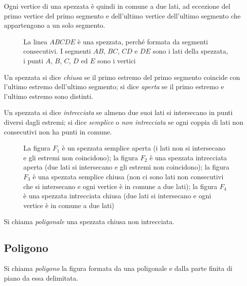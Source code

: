 Ogni vertice di una spezzata è quindi in comune a due lati, ad eccezione del primo vertice del primo segmento e dell'ultimo vertice dell'ultimo segmento che appartengono a un solo segmento.

\begin{figure}[htb]
\centering
\caption{La linea $ABCDE$ è una spezzata, perché formata da segmenti consecutivi. I segmenti $AB$, $BC$, $CD$ e $DE$ sono i lati della spezzata, i punti $A$, $B$, $C$, $D$ ed $E$ sono i vertici}
\end{figure}

\begin{definizione}
Un spezzata si dice \emph{chiusa} se il primo estremo del primo segmento coincide con l'ultimo estremo dell'ultimo segmento; si dice \emph{aperta} se il primo estremo e l'ultimo estremo sono distinti.
\end{definizione}

\begin{definizione}
Un spezzata si dice \emph{intrecciata} se almeno due suoi lati si intersecano in punti diversi dagli estremi; si dice \emph{semplice} o \emph{non intrecciata} se ogni coppia di lati non consecutivi non ha punti in comune.
\end{definizione}

\begin{figure}[htb]
\centering
\caption{La figura $F_1$ è un spezzata semplice aperta (i lati non si intersecano e gli estremi non coincidono); la figura $F_2$ è una spezzata intrecciata aperta (due lati si intersecano e gli estremi non coincidono); la figura $F_3$ è una spezzata semplice chiusa (non ci sono lati non consecutivi che si intersecano e ogni vertice è in comune a due lati); la figura $F_4$ è una spezzata intrecciata chiusa (due lati si intersecano e ogni vertice è in comune a due lati)}
\end{figure}

\begin{definizione}
Si chiama \emph{poligonale} una spezzata chiusa non intrecciata.
\end{definizione}

\subsection{Poligono}

\begin{definizione}
Si chiama \emph{poligono} la figura formata da una poligonale e dalla parte finita di piano da essa delimitata.
\end{definizione}

